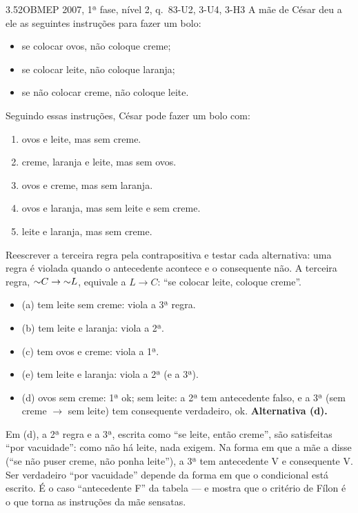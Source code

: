 \begin{exemplo}{3.5}{2}{OBMEP 2007, 1ª fase, nível 2, q.~8}{3-U2, 3-U4, 3-H3}\label{ex:3.5}
A mãe de César deu a ele as seguintes instruções para fazer um bolo:
\begin{itemize}
  \item se colocar ovos, não coloque creme;
  \item se colocar leite, não coloque laranja;
  \item se não colocar creme, não coloque leite.
\end{itemize}
Seguindo essas instruções, César pode fazer um bolo com:
\begin{enumerate}[label=(\alph*)]
  \item ovos e leite, mas sem creme.
  \item creme, laranja e leite, mas sem ovos.
  \item ovos e creme, mas sem laranja.
  \item ovos e laranja, mas sem leite e sem creme.
  \item leite e laranja, mas sem creme.
\end{enumerate}
\plano Reescrever a terceira regra pela contrapositiva e testar cada alternativa: uma regra é violada quando o antecedente acontece e o consequente não.
\resolucao
A terceira regra, ${{\sim}}C\rightarrow{{\sim}}L$, equivale a $L\rightarrow C$: \enquote{se colocar leite, coloque creme}.
\begin{itemize}
  \item (a) tem leite sem creme: viola a 3ª regra.
  \item (b) tem leite e laranja: viola a 2ª.
  \item (c) tem ovos e creme: viola a 1ª.
  \item (e) tem leite e laranja: viola a 2ª (e a 3ª).
  \item (d) ovos sem creme: 1ª ok; sem leite: a 2ª tem antecedente falso, e a 3ª (sem creme $\rightarrow$ sem leite) tem consequente verdadeiro, ok. \textbf{Alternativa (d).}
\end{itemize}
\comentario Em (d), a 2ª regra e a 3ª, escrita como \enquote{se leite, então creme}, são satisfeitas \enquote{por vacuidade}: como não há leite, nada exigem. Na forma em que a mãe a disse (\enquote{se não puser creme, não ponha leite}), a 3ª tem antecedente V e consequente V. Ser verdadeiro \enquote{por vacuidade} depende da forma em que o condicional está escrito. É o caso \enquote{antecedente F} da tabela — e mostra que o critério de Fílon é o que torna as instruções da mãe sensatas.
\end{exemplo}

